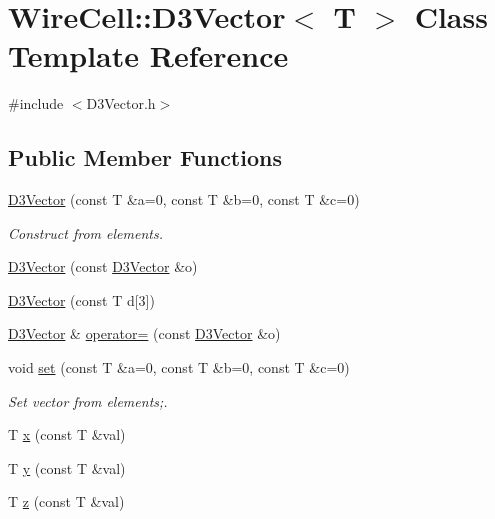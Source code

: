 \hypertarget{class_wire_cell_1_1_d3_vector}{}\section{Wire\+Cell\+:\+:D3\+Vector$<$ T $>$ Class Template Reference}
\label{class_wire_cell_1_1_d3_vector}


{\ttfamily \#include $<$D3\+Vector.\+h$>$}

\subsection*{Public Member Functions}
\begin{DoxyCompactItemize}
\item 
\hyperlink{class_wire_cell_1_1_d3_vector_a0bb7ef1f53b89ca0c137d8ccb3b246af}{D3\+Vector} (const T \&a=0, const T \&b=0, const T \&c=0)
\begin{DoxyCompactList}\small\item\em Construct from elements. \end{DoxyCompactList}\item 
\hyperlink{class_wire_cell_1_1_d3_vector_a192b9c89af9820765b1f730f63686e98}{D3\+Vector} (const \hyperlink{class_wire_cell_1_1_d3_vector}{D3\+Vector} \&o)
\item 
\hyperlink{class_wire_cell_1_1_d3_vector_ac923609cfdaf817081acd82d0cd7474c}{D3\+Vector} (const T d\mbox{[}3\mbox{]})
\item 
\hyperlink{class_wire_cell_1_1_d3_vector}{D3\+Vector} \& \hyperlink{class_wire_cell_1_1_d3_vector_a912036ea6a79006cb0124f8347ae8f7e}{operator=} (const \hyperlink{class_wire_cell_1_1_d3_vector}{D3\+Vector} \&o)
\item 
void \hyperlink{class_wire_cell_1_1_d3_vector_ada1f1aed4e0f6d2bc893c4290bcfa78a}{set} (const T \&a=0, const T \&b=0, const T \&c=0)
\begin{DoxyCompactList}\small\item\em Set vector from elements;. \end{DoxyCompactList}\item 
T \hyperlink{class_wire_cell_1_1_d3_vector_a9897c0952e82c2e7c285a4f064c00c80}{x} (const T \&val)
\item 
T \hyperlink{class_wire_cell_1_1_d3_vector_aa163ee62b7a8643fa374b2c4d3e3b386}{y} (const T \&val)
\item 
T \hyperlink{class_wire_cell_1_1_d3_vector_aabb1a5422a461697542a6755f30b575e}{z} (const T \&val)

\end{DoxyCompactItemize}
